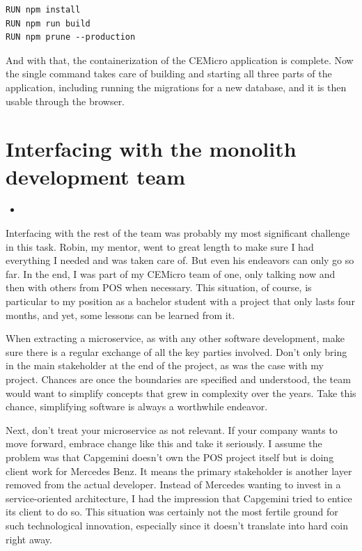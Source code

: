 \begin{lstlisting}
RUN npm install
RUN npm run build
RUN npm prune --production
\end{lstlisting}

And with that, the containerization of the CEMicro application is complete. Now the single command  takes care of building and starting all three parts of the application, including running the migrations for a new database, and it is then usable through the browser.


\section{Interfacing with the monolith development team}

\begin{itemize}
  \item {}
\end{itemize}

Interfacing with the rest of the team was probably my most significant challenge in this task. Robin, my mentor, went to great length to make sure I had everything I needed and was taken care of. But even his endeavors can only go so far. In the end, I was part of my CEMicro team of one, only talking now and then with others from POS when necessary. This situation, of course, is particular to my position as a bachelor student with a project that only lasts four months, and yet, some lessons can be learned from it.

When extracting a microservice, as with any other software development, make sure there is a regular exchange of all the key parties involved. Don't only bring in the main stakeholder at the end of the project, as was the case with my project. Chances are once the boundaries are specified and understood, the team would want to simplify concepts that grew in complexity over the years. Take this chance, simplifying software is always a worthwhile endeavor.

Next, don't treat your microservice as not relevant. If your company wants to move forward, embrace change like this and take it seriously. I assume the problem was that Capgemini doesn't own the POS project itself but is doing client work for Mercedes Benz. It means the primary stakeholder is another layer removed from the actual developer. Instead of Mercedes wanting to invest in a service-oriented architecture, I had the impression that Capgemini tried to entice its client to do so. This situation was certainly not the most fertile ground for such technological innovation, especially since it doesn't translate into hard coin right away.

